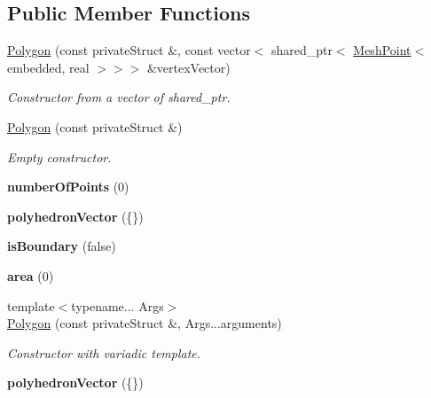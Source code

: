 \subsection*{\-Public \-Member \-Functions}
\begin{DoxyCompactItemize}
\item 
\hyperlink{class_polygon_af5bca80e9a6a306460d7235cd5436385}{\-Polygon} (const private\-Struct \&, const vector$<$ shared\-\_\-ptr$<$ \hyperlink{class_mesh_point}{\-Mesh\-Point}$<$ embedded, real $>$$>$$>$ \&vertex\-Vector)
\begin{DoxyCompactList}\small\item\em \-Constructor from a vector of shared\-\_\-ptr. \end{DoxyCompactList}\item 
\hyperlink{class_polygon_a13a8d5ce1ddba0c542fdbb667b0a9cc9}{\-Polygon} (const private\-Struct \&)
\begin{DoxyCompactList}\small\item\em \-Empty constructor. \end{DoxyCompactList}\item 
\hypertarget{class_polygon_ace4f1b4f301fad74aa408a9685cbbcfe}{{\bfseries number\-Of\-Points} (0)}\label{class_polygon_ace4f1b4f301fad74aa408a9685cbbcfe}

\item 
\hypertarget{class_polygon_a5a42f19a2f795022bcd75bb8af081d37}{{\bfseries polyhedron\-Vector} (\{\})}\label{class_polygon_a5a42f19a2f795022bcd75bb8af081d37}

\item 
\hypertarget{class_polygon_abcf034f39dd420a33f650510ecc3bb98}{{\bfseries is\-Boundary} (false)}\label{class_polygon_abcf034f39dd420a33f650510ecc3bb98}

\item 
\hypertarget{class_polygon_a5288995359998f39cd317212e7346510}{{\bfseries area} (0)}\label{class_polygon_a5288995359998f39cd317212e7346510}

\item 
{\footnotesize template$<$typename... \-Args$>$ }\\\hyperlink{class_polygon_aeeae92fe9691e9bba131228f38ac08a7}{\-Polygon} (const private\-Struct \&, \-Args...\-arguments)
\begin{DoxyCompactList}\small\item\em \-Constructor with variadic template. \end{DoxyCompactList}\item 
\hypertarget{class_polygon_a5a42f19a2f795022bcd75bb8af081d37}{{\bfseries polyhedron\-Vector} (\{\})}\label{class_polygon_a5a42f19a2f795022bcd75bb8af081d37}


\end{DoxyCompactItemize}
